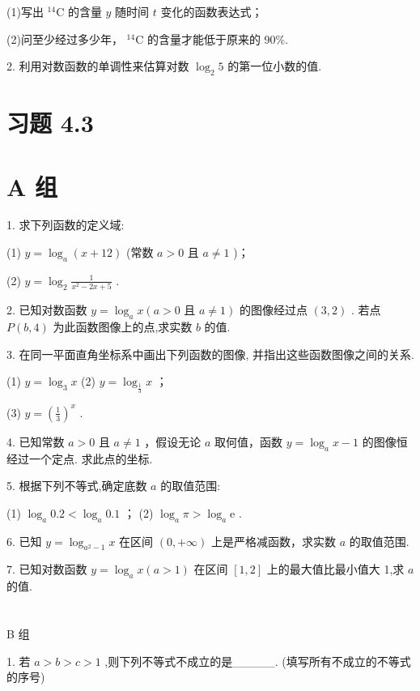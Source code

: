 \documentclass[10pt]{article}
\begin{document}
(1)写出 \({}^{14}\mathrm{C}\) 的含量 \(y\) 随时间 \(t\) 变化的函数表达式；

(2)问至少经过多少年， \({}^{14}\mathrm{C}\) 的含量才能低于原来的 90\%.

2. 利用对数函数的单调性来估算对数 \({\log }_{2}5\) 的第一位小数的值.

\section*{习题 4.3}

\section*{A 组}

1. 求下列函数的定义域:

(1) \(y = {\log }_{a}\left( {x + {12}}\right)\) (常数 \(a > 0\) 且 \(a \neq  1\) )；

(2) \(y = {\log }_{2}\frac{1}{{x}^{2} - {2x} + 5}\) .

2. 已知对数函数 \(y = {\log }_{a}x\left( {a > 0\text{ 且 }a \neq  1}\right)\) 的图像经过点 \(\left( {3,2}\right)\) . 若点 \(P\left( {b,4}\right)\) 为此函数图像上的点,求实数 \(b\) 的值.

3. 在同一平面直角坐标系中画出下列函数的图像, 并指出这些函数图像之间的关系.

(1) \(y = {\log }_{3}x\) (2) \(y = {\log }_{\frac{1}{3}}x\) ；

(3) \(y = {\left( \frac{1}{3}\right) }^{x}\) .

4. 已知常数 \(a > 0\) 且 \(a \neq  1\) ，假设无论 \(a\) 取何值，函数 \(y = {\log }_{a}x - 1\) 的图像恒经过一个定点. 求此点的坐标.

5. 根据下列不等式,确定底数 \(a\) 的取值范围:

(1) \({\log }_{a}{0.2} < {\log }_{a}{0.1}\) ； (2) \({\log }_{a}\pi  > {\log }_{a}\mathrm{e}\) .

6. 已知 \(y = {\log }_{{a}^{2} - 1}x\) 在区间 \(\left( {0, + \infty }\right)\) 上是严格减函数，求实数 \(a\) 的取值范围.

7. 已知对数函数 \(y = {\log }_{a}x\left( {a > 1}\right)\) 在区间 \(\left\lbrack  {1,2}\right\rbrack\) 上的最大值比最小值大 1,求 \(a\) 的值.

\section*{}

B 组

1. 若 \(a > b > c > 1\) ,则下列不等式不成立的是\_\_\_\_\_. (填写所有不成立的不等式的序号)
\end{document}

